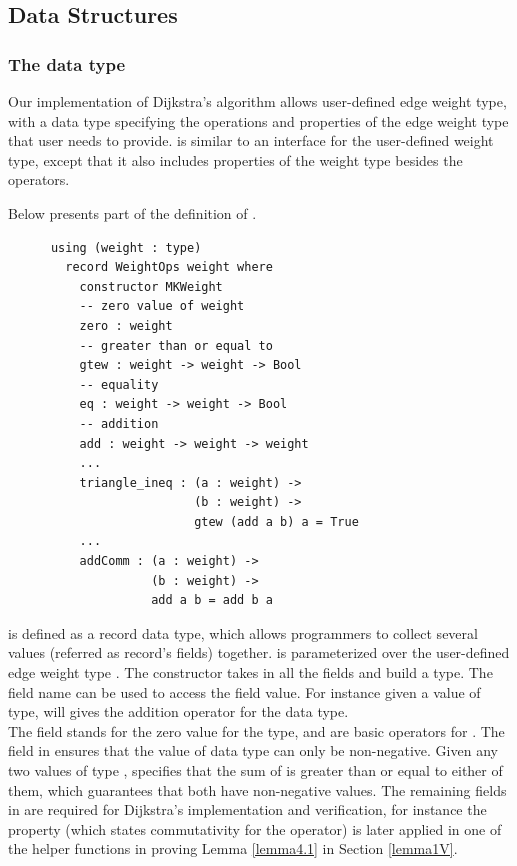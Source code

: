 \subsection{Data Structures} \label{code_structs}
\subsubsection{The  data type}
Our implementation of Dijkstra's algorithm allows user-defined edge weight type, with a  data type specifying the operations and properties of the edge weight type that user needs to provide.  is similar to an interface for the user-defined weight type, except that it also includes properties of the weight type besides the operators. 

Below presents part of the definition of . 
\begin{lstlisting}
      using (weight : type)
        record WeightOps weight where
          constructor MKWeight
          -- zero value of weight
          zero : weight
          -- greater than or equal to
          gtew : weight -> weight -> Bool
          -- equality
          eq : weight -> weight -> Bool
          -- addition
          add : weight -> weight -> weight
          ...
          triangle_ineq : (a : weight) -> 
                          (b : weight) -> 
                          gtew (add a b) a = True
          ...
          addComm : (a : weight) -> 
                    (b : weight) -> 
                    add a b = add b a
\end{lstlisting}

 is defined as a record data type, which allows programmers to collect several values (referred as record's fields) together.  is parameterized over the user-defined edge weight type . The  constructor takes in all the fields and build a  type. The field name can be used to access the field value. For instance given a value  of  type,  will gives the addition operator for the  data type. 
\\

The  field stands for the zero value for the  type, and  are basic operators for . The  field in  ensures that the value of  data type can only be non-negative. Given any two values  of type ,  specifies that the sum of  is greater than or equal to either of them, which guarantees that both  have non-negative values. The remaining fields in  are required for Dijkstra's implementation and verification, for instance the  property (which states commutativity for the  operator) is later applied in one of the helper functions in proving Lemma \ref{lemma4.1} in Section \ref{lemma1V}. 
\\

